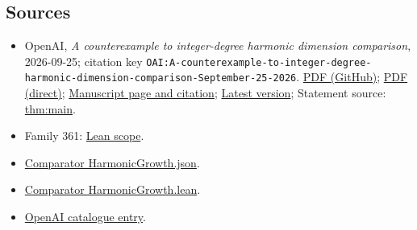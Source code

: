 \documentclass[11pt]{article}
\begin{document}
\subsection{Sources}
\begin{itemize}
\item OpenAI, \emph{A counterexample to integer-degree harmonic dimension comparison}, 2026-09-25; citation key \texttt{OAI:A-counterexample-to-integer-degree-harmonic-dimension-comparison-September-25-2026}. \href{https://github.com/openai/math/blob/adc7f1241b42e322a6451854ab7e4b4c146bf78a/preprints/A-counterexample-to-integer-degree-harmonic-dimension-comparison-September-25-2026/paper.pdf}{PDF (GitHub)}; \href{https://github.com/openai/math/raw/adc7f1241b42e322a6451854ab7e4b4c146bf78a/preprints/A-counterexample-to-integer-degree-harmonic-dimension-comparison-September-25-2026/paper.pdf}{PDF (direct)}; \href{https://github.com/openai/math/blob/adc7f1241b42e322a6451854ab7e4b4c146bf78a/preprints/A-counterexample-to-integer-degree-harmonic-dimension-comparison-September-25-2026/README.md}{Manuscript page and citation}; \href{https://github.com/openai/math/blob/main/preprints/A-counterexample-to-integer-degree-harmonic-dimension-comparison-September-25-2026/paper.pdf}{Latest version}; Statement source: \href{https://github.com/openai/math/blob/adc7f1241b42e322a6451854ab7e4b4c146bf78a/preprints/A-counterexample-to-integer-degree-harmonic-dimension-comparison-September-25-2026/build/sections/introduction.tex\#L23}{thm:main}.
\item Family 361: \href{https://github.com/openai/math/blob/adc7f1241b42e322a6451854ab7e4b4c146bf78a/lean/docs/361.md}{Lean scope}.
\item \href{https://github.com/openai/math/blob/adc7f1241b42e322a6451854ab7e4b4c146bf78a/lean/ComparatorChallenges/HarmonicGrowth.json}{Comparator HarmonicGrowth.json}.
\item \href{https://github.com/openai/math/blob/adc7f1241b42e322a6451854ab7e4b4c146bf78a/lean/ComparatorChallenges/HarmonicGrowth.lean}{Comparator HarmonicGrowth.lean}.
\item \href{https://github.com/openai/math/blob/adc7f1241b42e322a6451854ab7e4b4c146bf78a/CONTENTS.md}{OpenAI catalogue entry}.
\end{itemize}
\end{document}
